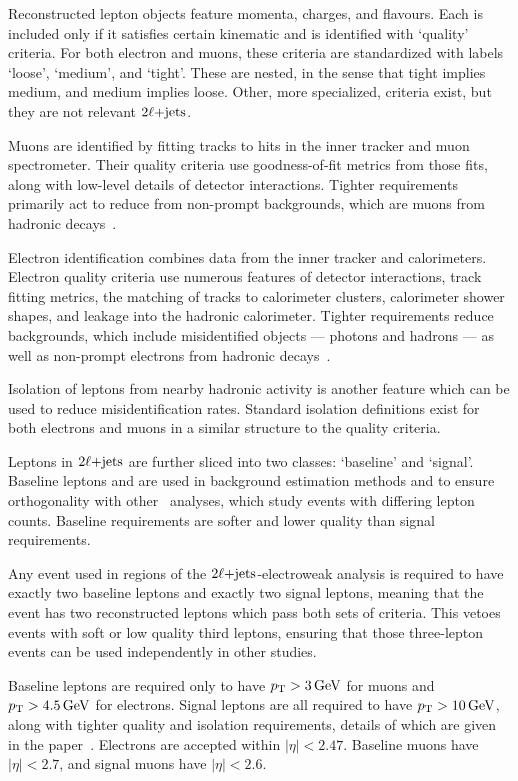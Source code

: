 Reconstructed lepton objects feature momenta, charges, and flavours.
Each is included only if it satisfies certain kinematic and
is identified with `quality' criteria.
For both electron and muons, these criteria are standardized with labels
`loose', `medium', and `tight'.
These are nested, in the sense that tight implies medium,
and medium implies loose.
Other, more specialized, criteria exist, but they are not relevant $\twoljets$.

Muons are identified by fitting tracks to hits in the inner tracker and muon
spectrometer.
Their quality criteria use goodness-of-fit metrics from those fits, along with
low-level details of detector interactions.
Tighter requirements primarily act to reduce from non-prompt backgrounds,
which are muons from hadronic decays~\cite{atlas_muon_quality_MUON_2018_03}.

Electron identification combines data from the inner tracker and
calorimeters.
Electron quality criteria use numerous features of detector
interactions, track fitting metrics, the matching of tracks to calorimeter
clusters, calorimeter shower shapes, and leakage into the hadronic calorimeter.
Tighter requirements reduce backgrounds, which include misidentified objects
--- photons and hadrons --- as well as non-prompt electrons from hadronic
decays~\cite{atlas_egamma_quality_EGAM_2018_01}.

Isolation of leptons from nearby hadronic activity is another feature which
can be used to reduce misidentification rates.
Standard isolation definitions exist for both electrons and muons in a similar
structure to the quality criteria.

Leptons in $\twoljets$ are further sliced into two classes:
`baseline' and `signal'.
Baseline leptons and are used in background estimation methods and to ensure
orthogonality with other \atlas\ analyses, which study events with differing
lepton counts.
Baseline requirements are softer and lower quality than signal requirements.

Any event used in regions of the $\twoljets$-electroweak analysis is required
to have exactly two baseline leptons and exactly two signal leptons, meaning
that the event has two reconstructed leptons which pass both sets of criteria.
This vetoes events with soft or low quality third leptons, ensuring that those
three-lepton events can be used independently in other studies.

Baseline leptons are required only to have $\pt > 3\,\eV[G]$ for muons and
$\pt > 4.5\,\eV[G]$ for electrons.
Signal leptons are all required to have $\pt > 10\,\eV[G]$, along with tighter
quality and isolation requirements, details of which are given in the
paper~\cite{atlas2022searches}.
Electrons are accepted within $|\eta| < 2.47$.
Baseline muons have $|\eta| < 2.7$, and signal muons have $|\eta| < 2.6$.


